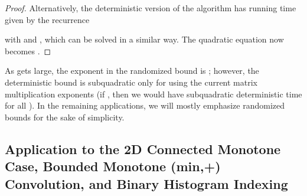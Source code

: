 \documentclass[11pt]{article}
\newtheorem{theorem}{Theorem}[section]
\newcommand{\IGNORE}[1]{}
\begin{document}
\begin{proof}
\IGNORE{
\begin{theorem}
Alternatively, we can solve the problem in Theorem~\ref{thm-monotone} in
 deterministic time where
 is the larger root of
.
Here, , and
 and  are
the square and rectangular matrix multiplication exponents.
\end{theorem}
\begin{proof}
}

Alternatively, the deterministic version of the algorithm
has running time
given by the recurrence

with  and ,
which can be solved in a similar way.
The quadratic equation now becomes
.
\end{proof}

\IGNORE{
For example, for , the randomized time bound is
 (attained
by setting  and )
and the
deterministic time bound is  (attained
by setting  and ).
}
As  gets
large, the exponent in the randomized bound is
; however, the deterministic bound
is subquadratic only for  using
the current matrix multiplication exponents
(if , then we would have subquadratic deterministic
time for all ).
In the remaining applications, we will mostly emphasize randomized bounds for the sake of simplicity.

\IGNORE{

w := 2.3728639;
r := 0.30298;
mu := (3-r-w)/(1-r);
d := 2;
solve({z = mu*y+w*t, z = -y+2*t+(1-t)*z, z = 6*y + t + d*(1-t)});

w := 2.3728639;
r := 0.30298;
mu := (3-r-w)/(1-r);
z := proc(d)  a := 6-mu; b := d*(1+mu)-13+w+2*mu; c := -d*(w+2*mu);
              (-b + sqrt(b^2 - 4*a*c))/(2*a); end;
> z(2);
                           1.863158551

> z(3);
                           1.900083074

> z(4);
                           1.929989472

> z(5);
                           1.954841478

> z(6);
                           1.975898027

> z(7);
                           1.994013663

> z(8);
                           2.009793911

}


\subsection{Application to the 2D Connected Monotone Case,
Bounded Monotone (min,+) Convolution, and
Binary Histogram Indexing}\label{sec:mono:appl}
\end{document}
